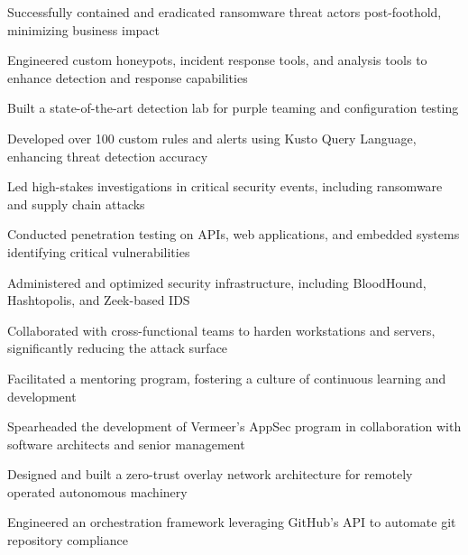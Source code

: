 \item Successfully contained and eradicated ransomware threat actors post-foothold, minimizing business impact
\item Engineered custom honeypots, incident response tools, and analysis tools to enhance detection and response capabilities
\item Built a state-of-the-art detection lab for purple teaming and configuration testing
\item Developed over 100 custom rules and alerts using Kusto Query Language, enhancing threat detection accuracy
\item Led high-stakes investigations in critical security events, including ransomware and supply chain attacks
\item Conducted penetration testing on APIs, web applications, and embedded systems identifying critical vulnerabilities
\item Administered and optimized security infrastructure, including BloodHound, Hashtopolis, and Zeek-based IDS
\item Collaborated with cross-functional teams to harden workstations and servers, significantly reducing the attack surface
\item Facilitated a mentoring program, fostering a culture of continuous learning and development
\item Spearheaded the development of Vermeer's AppSec program in collaboration with software architects and senior management
\item Designed and built a zero-trust overlay network architecture for remotely operated autonomous machinery
\item Engineered an orchestration framework leveraging GitHub's API to automate git repository compliance